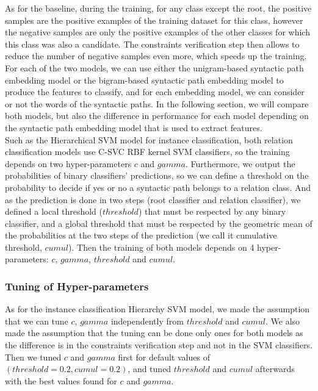 \documentclass[12pt]{article}
\begin{document}
As for the baseline, during the training, for any class except the root, the positive samples are the positive examples of the training dataset for this class, however the negative samples are only the positive examples of the other classes for which this class was also a candidate. The constraints verification step then allows to reduce the number of negative samples even more, which speeds up the training.\\
For each of the two models, we can use either the unigram-based syntactic path embedding model or the bigram-based syntactic path embedding model to produce the features to classify, and for each embedding model, we can consider or not the words of the syntactic paths. In the following section, we will compare both models, but also the difference in performance for each model depending on the syntactic path embedding model that is used to extract features.\\
Such as the Hierarchical SVM model for instance classification, both relation classification models use C-SVC RBF kernel SVM classifiers, so the training depends on two hyper-parameters $c$ and $gamma$. Furthermore, we output the probabilities of binary classifiers' predictions, so we can define a threshold on the probability to decide if yes or no a syntactic path belongs to a relation class. And as the prediction is done in two steps (root classifier and relation classifier), we defined a local threshold ($threshold$) that must be respected by any binary classifier, and a global threshold that must be respected by the geometric mean of the probabilities at the two steps of the prediction (we call it cumulative threshold, $cumul$). Then the training of both models depends on 4 hyper-parameters: $c$, $gamma$, $threshold$ and $cumul$.

\subsubsection{Tuning of Hyper-parameters}

As for the instance classification Hierarchy SVM model, we made the assumption that we can tune $c$, $gamma$ independently from $threshold$ and $cumul$. We also made the assumption that the tuning can be done only ones for both models as the difference is in the constraints verification step and not in the SVM classifiers. Then we tuned $c$ and $gamma$ first for default values of $(threshold=0.2, cumul=0.2)$, and tuned $threshold$ and $cumul$ afterwards with the best values found for $c$ and $gamma$.
\end{document}
